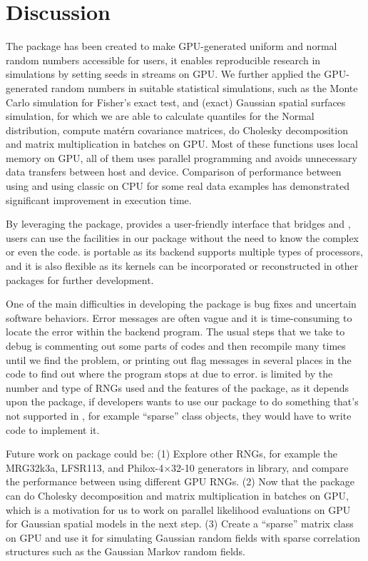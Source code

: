 \documentclass[article,nojss]{jss}\usepackage[]{graphicx}\usepackage[]{color}
\begin{document}
\section{Discussion}
The package  has been created to make GPU-generated uniform and normal random numbers accessible for  users, it enables reproducible research in simulations by setting seeds in streams on GPU. We further applied the GPU-generated random numbers in suitable statistical simulations, such as the Monte Carlo simulation for Fisher’s exact test, and (exact) Gaussian spatial surfaces simulation, for which we are able to calculate quantiles for the Normal distribution, compute mat\'ern covariance matrices, do Cholesky decomposition and matrix multiplication in batches on GPU. Most of these functions uses local memory on GPU, all of them uses parallel programming and avoids unnecessary data transfers between host and device. Comparison of performance between using  and using classic  on CPU for some real data examples has demonstrated significant improvement in execution time. 

By leveraging the  package,  provides a user-friendly interface that bridges  and , users can use the facilities in our package without the need to know the complex  or even the  code.   is portable as its backend  supports multiple types of processors, and it is also flexible as its kernels can be incorporated or reconstructed in other  packages for further development. 

One of the main difficulties in developing the package is bug fixes and uncertain software behaviors. Error messages are often vague and it is time-consuming to locate the error within the backend  program. The usual steps that we take to debug is commenting out some parts of codes and then recompile many times until we find the problem, or printing out flag messages in several places in the code to find out where the program stops at due to error.  is limited by the number and type of  RNGs used and the features of the  package, as it depends upon the  package, if developers wants to use our package to do something that's not supported in , for example ``sparse'' class objects, they would have to write  code to implement it.

Future work on  package could be: (1) Explore other RNGs, for example the MRG32k3a, LFSR113, and Philox-4×32-10 generators in  library, and compare the  performance between using different GPU RNGs. (2) Now that the package can do Cholesky decomposition and matrix multiplication in batches on GPU, which is a motivation for us to work on parallel likelihood evaluations on GPU for Gaussian spatial models in the next step. (3) Create a ``sparse'' matrix class on GPU and use it for simulating Gaussian random fields with sparse correlation structures such as the Gaussian Markov random fields.










\newpage

\begin{appendix}


\end{appendix}
\end{document}
